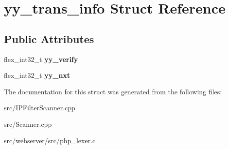\section{yy\_\-trans\_\-info Struct Reference}
\label{structyy__trans__info}
\subsection*{Public Attributes}
\begin{DoxyCompactItemize}
\item 
flex\_\-int32\_\-t {\bfseries yy\_\-verify}\label{structyy__trans__info_a5c9f61e770deef50bd4e697310342fe9}

\item 
flex\_\-int32\_\-t {\bfseries yy\_\-nxt}\label{structyy__trans__info_ae0715250c2bef261e596e77e0030f13e}

\end{DoxyCompactItemize}


The documentation for this struct was generated from the following files:\begin{DoxyCompactItemize}
\item 
src/IPFilterScanner.cpp\item 
src/Scanner.cpp\item 
src/webserver/src/php\_\-lexer.c\end{DoxyCompactItemize}
